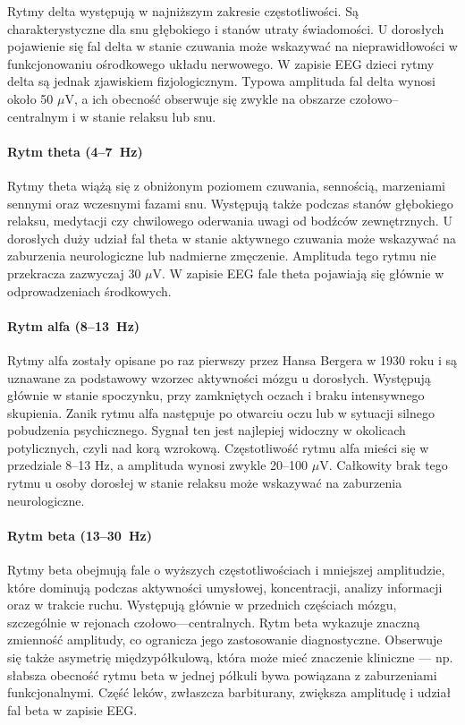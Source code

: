Rytmy delta występują w najniższym zakresie częstotliwości. Są charakterystyczne dla snu głębokiego i stanów utraty świadomości. U dorosłych pojawienie się fal delta w stanie czuwania może wskazywać na nieprawidłowości w funkcjonowaniu ośrodkowego układu nerwowego. W zapisie EEG dzieci rytmy delta są jednak zjawiskiem fizjologicznym. Typowa amplituda fal delta wynosi około 50 $\mu$V, a ich obecność obserwuje się zwykle na obszarze czołowo--centralnym i w stanie relaksu lub snu.

\paragraph{Rytm theta (4--7~Hz)}

Rytmy theta wiążą się z obniżonym poziomem czuwania, sennością, marzeniami sennymi oraz wczesnymi fazami snu. Występują także podczas stanów głębokiego relaksu, medytacji czy chwilowego oderwania uwagi od bodźców zewnętrznych. U dorosłych duży udział fal theta w stanie aktywnego czuwania może wskazywać na zaburzenia neurologiczne lub nadmierne zmęczenie. Amplituda tego rytmu nie przekracza zazwyczaj 30 $\mu$V. W zapisie EEG fale theta pojawiają się głównie w odprowadzeniach środkowych.

\paragraph{Rytm alfa (8--13~Hz)}

Rytmy alfa zostały opisane po raz pierwszy przez Hansa Bergera w 1930 roku i są uznawane za podstawowy wzorzec aktywności mózgu u dorosłych. Występują głównie w stanie spoczynku, przy zamkniętych oczach i braku intensywnego skupienia. Zanik rytmu alfa następuje po otwarciu oczu lub w sytuacji silnego pobudzenia psychicznego. Sygnał ten jest najlepiej widoczny w okolicach potylicznych, czyli nad korą wzrokową. Częstotliwość rytmu alfa mieści się w przedziale 8--13 Hz, a amplituda wynosi zwykle 20--100 $\mu$V. Całkowity brak tego rytmu u osoby dorosłej w stanie relaksu może wskazywać na zaburzenia neurologiczne.

\paragraph{Rytm beta (13--30~Hz)}

Rytmy beta obejmują fale o wyższych częstotliwościach i mniejszej amplitudzie, które dominują podczas aktywności umysłowej, koncentracji, analizy informacji oraz w trakcie ruchu. Występują głównie w przednich częściach mózgu, szczególnie w rejonach czołowo---centralnych. Rytm beta wykazuje znaczną zmienność amplitudy, co ogranicza jego zastosowanie diagnostyczne. Obserwuje się także asymetrię międzypółkulową, która może mieć znaczenie kliniczne --- np. słabsza obecność rytmu beta w jednej półkuli bywa powiązana z zaburzeniami funkcjonalnymi. Część leków, zwłaszcza barbiturany, zwiększa amplitudę i udział fal beta w zapisie EEG.

